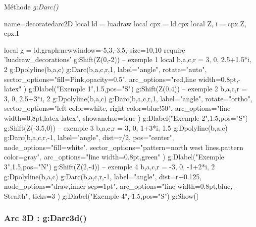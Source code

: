 \begin{demo}{Méthode \emph{g:Darc()}}
\begin{luadraw}{name=decoratedarc2D}
local ld = luadraw
local cpx = ld.cpx
local Z, i = cpx.Z, cpx.I

local g = ld.graph:new{window={-5,3,-3,5}, size={10,10}}
require 'luadraw_decorations'
g:Shift(Z(0,-2)) -- exemple 1
local b,a,c,r = 3, 0, 2.5+1.5*i, 2
g:Dpolyline({b,a,c})
g:Darc(b,a,c,r,1, {
    label="angle", rotate="auto", 
    sector_options="fill=Pink,opacity=0.5", 
    arc_options="red,line width=0.8pt,-latex"  })
g:Dlabel("Exemple 1",1.5,{pos="S"})
g:Shift(Z(0,4))  -- exemple 2     
b,a,c,r = 3, 0, 2.5+3*i, 2    
g:Dpolyline({b,a,c})
g:Darc(b,a,c,r,1, {
    label="angle", rotate="ortho", 
    sector_options="left color=white, right color=blue!50", 
    arc_options="line width=0.8pt,latex-latex",
    showanchor=true  })
g:Dlabel("Exemple 2",1.5,{pos="S"})
g:Shift(Z(-3.5,0))  -- exemple 3     
b,a,c,r = 3, 0, 1+3*i, 1.5    
g:Dpolyline({b,a,c})
g:Darc(b,a,c,r,-1, {
    label="angle", dist=r/2, pos="center",
    node_options="fill=white",
    sector_options="pattern=north west lines,pattern color=gray", 
    arc_options="line width=0.8pt,green"   })
g:Dlabel("Exemple 3",1.5,{pos="N"})    
g:Shift(Z(2,-4)) -- exemple 4
b,a,c,r = -3, 0, -1+2*i, 2    
g:Dpolyline({b,a,c})
g:Darc(b,a,c,r,-1, {
    label="angle", dist=r+0.125, 
    node_options="draw,inner sep=1pt",
    arc_options="line width=0.8pt,blue,-Stealth",
    ticks=3  })
g:Dlabel("Exemple 4",-1.5,{pos="S"})
g:Show()
\end{luadraw}
\end{demo}

\subsubsection{Arc 3D : g:Darc3d()}

